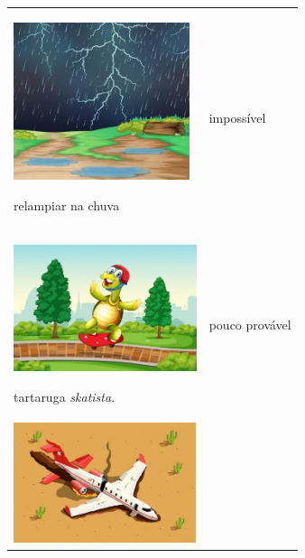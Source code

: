 \begin{longtable}[]{@{}ll@{}}
\toprule
\begin{minipage}[t]{0.48\columnwidth}\raggedright\strut
\includegraphics[width=2.03487in,height=1.82023in]{media/image82.jpg}

relampiar na chuva\strut
\end{minipage} & \begin{minipage}[t]{0.48\columnwidth}\raggedright\strut
impossível\strut
\end{minipage}\tabularnewline
\begin{minipage}[t]{0.48\columnwidth}\raggedright\strut
\includegraphics[width=2.11035in,height=1.45968in]{media/image83.jpg}

tartaruga \emph{skatista.}\strut
\end{minipage} & \begin{minipage}[t]{0.48\columnwidth}\raggedright\strut
pouco provável\strut
\end{minipage}\tabularnewline
\begin{minipage}[t]{0.48\columnwidth}\raggedright\strut
\includegraphics[width=2.11129in,height=1.37616in]{media/image84.jpg}


\end{minipage}
\end{longtable}
